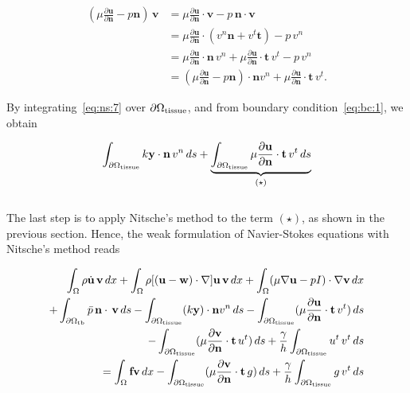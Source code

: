 \documentclass[11pt,a4paper,titlepage]{report}
\begin{document}
\begin{align}
(\mu \frac{\partial \mathbf{u}}{\partial \mathbf{n}} -  p \mathbf{n}) \, \mathbf{v}
& = \mu \frac{\partial \mathbf{u}}{\partial \mathbf{n}} \cdot \mathbf{v} - p \, \mathbf{n} \cdot \mathbf{v} \\
& = \mu \frac{\partial \mathbf{u}}{\partial \mathbf{n}} \cdot (v^n \mathbf{n} + v^t \mathbf{t}) - p \, v^n \\
& = \mu \frac{\partial \mathbf{u}}{\partial \mathbf{n}} \cdot \mathbf{n} \, v^n + \mu \frac{\partial \mathbf{u}}{\partial \mathbf{n}} \cdot \mathbf{t} \, v^t   - p \, v^n \\
\label{eq:ns:7}
& = (\mu \frac{\partial \mathbf{u}}{\partial \mathbf{n}} - p\mathbf{n}) \cdot \mathbf{n} v^n + \mu \frac{\partial \mathbf{u}}{\partial \mathbf{n}} \cdot \mathbf{t} \, v^t. 
\end{align}

By integrating~\eqref{eq:ns:7} over $\partial \Omega_{\rm tissue}$, and from boundary condition~\eqref{eq:bc:1}, we obtain

\begin{equation}
\int_{\partial \Omega_{\rm tissue}} k \mathbf{y} \cdot \mathbf{n} \, v^n \, ds 
+ \underbrace{ \int_{\partial \Omega_{\rm tissue}} \mu \frac{\partial \mathbf{u}}{\partial \mathbf{n}} \cdot \mathbf{t} \, v^t \, ds }_{(\star)}
\end{equation}
\\
The last step is to apply Nitsche's method to the term $(\star)$, as shown in the previous section. Hence, the weak formulation of Navier-Stokes equations with Nitsche's method reads

\begin{equation}
\begin{split}
\label{eq:nitsche:6}
 \int_{\Omega} \rho \dot{\mathbf{u}} \, \mathbf{v} \, dx
+ \int_{\Omega} \rho [(\mathbf{u - w}) \cdot \nabla] \mathbf{u} \, \mathbf{v} \, dx
+ \int_{\Omega} (\mu \nabla \mathbf{u} - pI) \cdot \nabla \mathbf{v} \, dx \\
+ \int_{\partial \Omega_{\rm tb}} \bar{p} \, \mathbf{n} \cdot \, \mathbf{v} \, ds  %
- \int_{\partial \Omega_{\rm tissue}} (k \mathbf{y}) \cdot \mathbf{n} v^n \, ds 
- \int_{\partial \Omega_{\rm tissue}} (\mu \frac{\partial \mathbf{u}}{\partial \mathbf{n}} \cdot \mathbf{t} \, v^t) \, ds \\
- \int_{\partial \Omega_{\rm tissue}} (\mu \frac{\partial \mathbf{v}}{\partial \mathbf{n}} \cdot \mathbf{t} \, u^t) \, ds
+ \frac{\gamma}{h} \int_{\partial \Omega_{\rm tissue}} u^t \, v^t \, ds \\
= \int_{\Omega} \mathbf{f} \mathbf{v} \, dx
- \int_{\partial \Omega_{\rm tissue}} (\mu \frac{\partial \mathbf{v}}{\partial \mathbf{n}} \cdot \mathbf{t} \, g) \, ds 
+ \frac{\gamma}{h} \int_{\partial \Omega_{\rm tissue}} g \, v^t \, ds
\end{split}
\end{equation}
\end{document}
